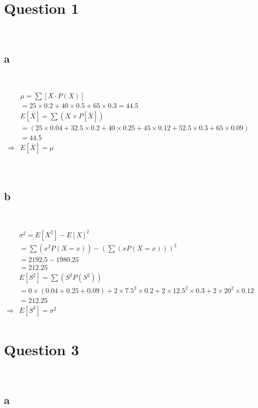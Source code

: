 \documentclass{article}
\begin{document}
\section*{Question 1}

~

\subsection*{a}

~

\begin{align*}
    &\mu=\sum[X\cdot P(X)]\\
    &=25\times0.2+40\times0.5+65\times0.3=44.5\\
    &E[\overline{X}]=\sum(\overline{X}\times P[\overline{X}])\\
    &=(25\times0.04+32.5\times0.2+40\times 0.25+45\times0.12+52.5\times 0.3+65\times0.09)\\
    &=44.5\\
    \Rightarrow&E[\overline{X}]=\mu\\
\end{align*}

~

\subsection*{b}

~

\begin{align*}
    &\sigma^2=E[X^2]-E[X]^2\\
    &=\sum(x^2P(X=x))-(\sum(xP(X=x)))^2\\
    &=2192.5-1980.25\\
    &=212.25\\
    &E[S^2]=\sum(S^2P(S^2))\\
    &=0\times(0.04+0.25+0.09)+2\times7.5^2\times0.2+2\times12.5^2\times0.3+2\times20^2\times0.12\\
    &=212.25\\
    \Rightarrow&E[S^2]=\sigma^2\\
\end{align*}

\newpage

\section*{Question 3}

~

\subsection*{a}
\end{document}
